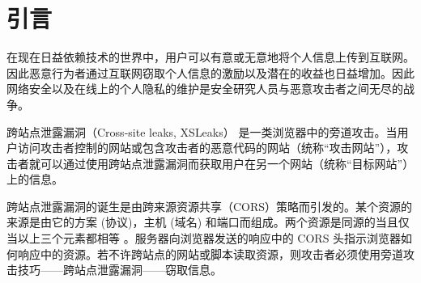 \section{引言}

在现在日益依赖技术的世界中，用户可以有意或无意地将个人信息上传到互联网。因此恶意行为者通过互联网窃取个人信息的激励以及潜在的收益也日益增加。因此网络安全以及在线上的个人隐私的维护是安全研究人员与恶意攻击者之间无尽的战争。

跨站点泄露漏洞（Cross-site leaks, XSLeaks）\cite{xsleaks} 是一类浏览器中的旁道攻击。当用户访问攻击者控制的网站或包含攻击者的恶意代码的网站（统称“攻击网站”），攻击者就可以通过使用跨站点泄露漏洞而获取用户在另一个网站（统称“目标网站”）上的信息。

跨站点泄露漏洞的诞生是由跨来源资源共享（CORS）策略而引发的。某个资源的来源是由它的方案 (协议)，主机 (域名) 和端口而组成。两个资源是同源的当且仅当以上三个元素都相等 \cite{origin}。服务器向浏览器发送的响应中的 CORS 头指示浏览器如何响应中的资源。若不许跨站点的网站或脚本读取资源，则攻击者必须使用旁道攻击技巧——跨站点泄露漏洞——窃取信息。